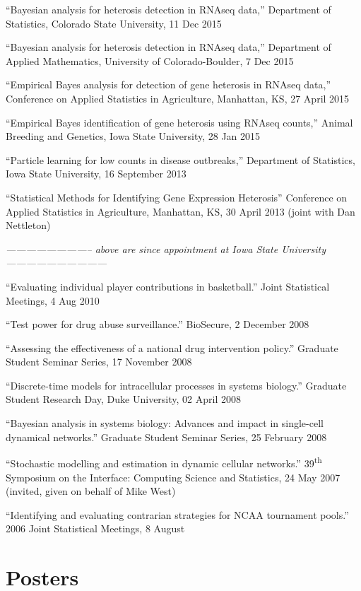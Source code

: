 \documentclass[overlapped,line]{res}
\newcommand{\sinceappt}{\emph{-------------------------- above are since appointment at Iowa State University ------------------------------}}
\newcommand{\sinceappt}{}
\begin{document}
\begin{resume}
{\small

``Bayesian analysis for heterosis detection in RNAseq data,'' Department of Statistics, Colorado State University, 11 Dec 2015

``Bayesian analysis for heterosis detection in RNAseq data,'' Department of Applied Mathematics, University of Colorado-Boulder, 7 Dec 2015

``Empirical Bayes analysis for detection of gene heterosis in RNAseq data,'' Conference on Applied Statistics in Agriculture, Manhattan, KS, 27 April 2015 

``Empirical Bayes identification of gene heterosis using RNAseq counts,'' Animal Breeding and Genetics, Iowa State University, 28 Jan 2015 

``Particle learning for low counts in disease outbreaks,'' Department of Statistics, Iowa State University, 16 September 2013 

``Statistical Methods for Identifying Gene Expression Heterosis'' Conference on Applied Statistics in Agriculture, Manhattan, KS, 30 April 2013 (joint with Dan Nettleton)

\sinceappt

``Evaluating individual player contributions in basketball.'' Joint Statistical Meetings, 4 Aug 2010 

``Test power for drug abuse surveillance.'' BioSecure, 2 December 2008 

``Assessing the effectiveness of a national drug intervention policy.'' Graduate Student Seminar Series, 17 November 2008 

``Discrete-time models for intracellular processes in systems biology.'' Graduate Student Research Day, Duke University, 02 April 2008 

``Bayesian analysis in systems biology: Advances and impact in single-cell dynamical networks.'' Graduate Student Seminar Series, 25 February 2008 

``Stochastic modelling and estimation in dynamic cellular networks.'' 39\textsuperscript{th} Symposium on the Interface: Computing Science and Statistics, 24 May 2007 (invited, given on behalf of Mike West)

``Identifying and evaluating contrarian strategies for NCAA tournament pools.'' 2006 Joint Statistical Meetings, 8 August 

}


\section{\bf Posters}


\end{resume}
\end{document}
